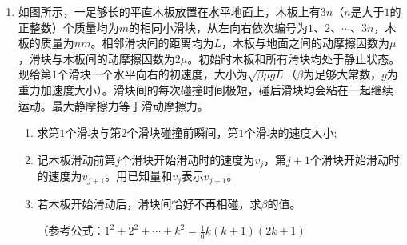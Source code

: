 \documentclass[\gkver]{gaokaozhenti}
\begin{document}
\begin{enumerate}
\item 
如图所示，一足够长的平直木板放置在水平地面上，木板上有$ 3n $（$ n $是大于$ 1 $的正整数）个质量均为$ m $的相同小滑块，从左向右依次编号为$ 1 $、$ 2 $、$ \cdots $、$ 3n $，木板的质量为$ nm $。相邻滑块间的距离均为$ L $，木板与地面之间的动摩擦因数为$ \mu $，滑块与木板间的动摩擦因数为$ 2 \mu $。初始时木板和所有滑块均处于静止状态。现给第$ 1 $个滑块一个水平向右的初速度，大小为$\sqrt{\beta \mu gL }$（$ \beta $为足够大常数，$ g $为重力加速度大小）。滑块间的每次碰撞时间极短，碰后滑块均会粘在一起继续运动。最大静摩擦力等于滑动摩擦力。
\begin{enumerate}
	\item
	求第$ 1 $个滑块与第$ 2 $个滑块碰撞前瞬间，第$ 1 $个滑块的速度大小;
	
	\item 
	记木板滑动前第$ j $个滑块开始滑动时的速度为$ v_j $，第$ j+1 $个滑块开始滑动时的速度为$ v_{j+1} $。用已知量和$ v_j $表示$ v_{j+1} $。
	
	\item 
	若木板开始滑动后，滑块间恰好不再相碰，求$ \beta $的值。
	
	（参考公式：$ 1^2+2^2+ \cdots +k^2= \frac{1}{6} k(k+1)(2k+1) $
	
	
\end{enumerate}


\end{enumerate}
\end{document}
